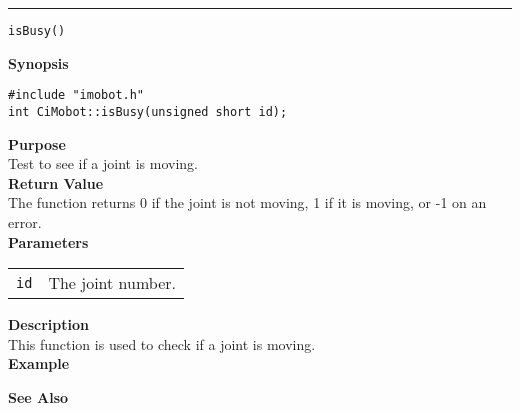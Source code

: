 \noindent
\vspace{5pt}
\rule{6.5in}{0.015in}
\noindent
{\LARGE \texttt{isBusy()}}\\
{}

\noindent
{\bf Synopsis}\\
\begin{verbatim}
#include "imobot.h"
int CiMobot::isBusy(unsigned short id);
\end{verbatim}

\noindent
{\bf Purpose}\\
Test to see if a joint is moving.\\

\noindent
{\bf Return Value}\\
The function returns 0 if the joint is not moving, 1 if it is moving, or -1 on an error.\\

\noindent
{\bf Parameters}
\vspace{-0.1in}
\begin{description}
\item               
\begin{tabular}{p{10 mm}p{145 mm}}
\texttt{id} & The joint number. \\
\end{tabular}
\end{description}

\noindent
{\bf Description}\\
This function is used to check if a joint is moving.\\

\noindent
{\bf Example}\\
\noindent

\noindent
{\bf See Also}\\

